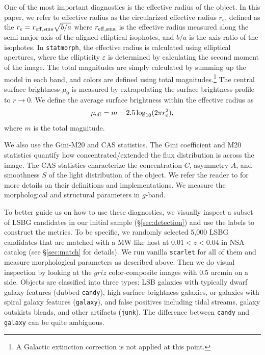 \documentclass[twocolumn,astrosymb,twocolappendix]{aastex631}
\newcommand{\code}[1]{\texttt{#1}}
\begin{document}
\begin{CJK*}{UTF8}{gbsn}
One of the most important diagnostics is the effective radius of the object. In this paper, we refer to effective radius as the circularized effective radius $r_{e}$, defined as the $r_{e} = r_{\rm eff, sma} \sqrt{b/a}$ where $r_{\rm eff, sma}$ is the effective radius measured along the semi-major axis of the aligned elliptical isophotes, and $b/a$ is the axis ratio of the isophotes. In \code{statmorph}, the effective radius is calculated using elliptical apertures, where the ellipticity $\varepsilon$ is determined by calculating the second moment of the image. The total magnitudes are simply calculated by summing up the model in each band, and colors are defined using total magnitudes.\footnote{A Galactic extinction correction is not applied at this point.} The central surface brightness $\mu_0$ is measured by extrapolating the surface brightness profile to $r\to 0$. We define the average surface brightness within the effective radius as 
\begin{equation}\label{eq:mu_eff}
    \mu_{\rm eff} = m - 2.5 \log_{10}(2 \pi r_e^2),
\end{equation}
where $m$ is the total magnitude. 

We also use the Gini-M20 and CAS statistics. The Gini coefficient and M20 statistics \citep{Abraham2003,Lotz2004} quantify how concentrated/extended the flux distribution is across the image. The CAS statistics characterize the concentration $C$, asymmetry $A$, and smoothness $S$ of the light distribution of the object. We refer the reader to \citet{statmorph} for more details on their definitions and implementations. We measure the morphological and structural parameters in $g$-band. %

To better guide us on how to use these diagnostics, we visually inspect a subset of LSBG candidates in our initial sample (\S \ref{sec:detection}) and use the labels to construct the metrics. To be specific, we randomly selected 5,000 LSBG candidates that are matched with a MW-like host at $0.01 < z < 0.04$ in NSA catalog (see \S\ref{sec:match} for details). We run vanilla \code{scarlet} for all of them and measure morphological parameters as described above. Then we do visual inspection by looking at the $griz$ color-composite images with 0.5 arcmin on a side. Objects are classified into three types: LSB galaxies with typically dwarf galaxy features (dubbed \code{candy}), high surface brightness galaxies, or galaxies with spiral galaxy features (\code{galaxy}), and false positives including tidal streams, galaxy outskirts blends, and other artifacts (\code{junk}). The difference between \code{candy} and \code{galaxy} can be quite ambiguous. 


\end{CJK*}
\end{document}
